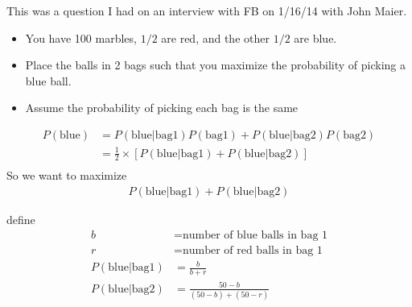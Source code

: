\documentclass{article}
\begin{document}


This was a question I had on an interview with FB on 1/16/14 with John Maier.

\begin{itemize}
  \item You have 100 marbles, $1/2$ are red, and the other $1/2$ are blue.
	\item Place the balls in 2 bags such that you maximize the probability of picking a blue ball.
	\item Assume the probability of picking each bag is the same
\end{itemize}

\begin{align}
P(\text{blue}) & = P(\text{blue} | \text{bag1})P(\text{bag1}) + P(\text{blue} | \text{bag2})P(\text{bag2})\\
 		& = \frac{1}{2} \times \left[ P(\text{blue} | \text{bag1}) + P(\text{blue} | \text{bag2}) \right]\\
\end{align}
So we want to maximize
\begin{align}
P(\text{blue} | \text{bag1}) + P(\text{blue} | \text{bag2})
\end{align}

\noindent
{}
define
\begin{align}
b & = \text{number of blue balls in bag 1}\\
r & = \text{number of red balls in bag 1}\\
P(\text{blue} | \text{bag1}) & = \frac{b}{b + r}\\
P(\text{blue} | \text{bag2}) & = \frac{50 - b}{(50 - b) + (50 -r)}\\
\end{align}
\end{document}
